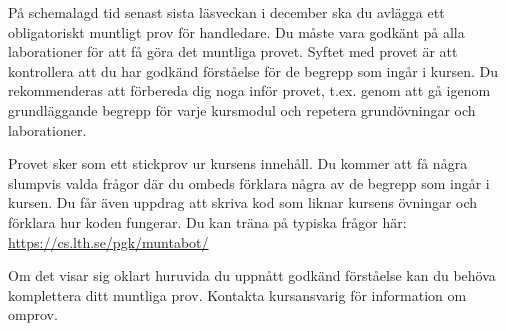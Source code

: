På schemalagd tid senast sista läsveckan i december ska du avlägga ett obligatoriskt muntligt prov för handledare. Du måste vara godkänt på alla laborationer för att få göra det muntliga provet. Syftet med provet är att kontrollera att du har godkänd förståelse för de begrepp som ingår i kursen. Du rekommenderas att förbereda dig noga inför provet, t.ex. genom att gå igenom grundläggande begrepp för varje kursmodul och repetera grundövningar och laborationer.

Provet sker som ett stickprov ur kursens innehåll. Du kommer att få några slumpvis valda frågor där du ombeds förklara några av de begrepp som ingår i kursen. Du får även uppdrag att skriva kod som liknar kursens övningar och förklara hur koden fungerar. Du kan träna på typiska frågor här: \url{https://cs.lth.se/pgk/muntabot/}

Om det visar sig oklart huruvida du uppnått godkänd förståelse kan du behöva komplettera ditt muntliga prov. Kontakta kursansvarig för information om omprov.  
